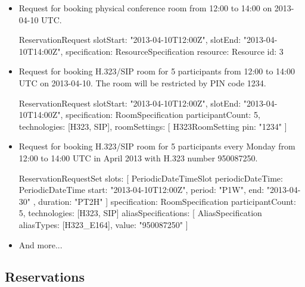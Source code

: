 \begin{itemize}

\item Request for booking physical conference room from 12:00 to 14:00 on 2013-04-10 UTC.
\begin{Entity}
ReservationRequest {
  slotStart: "2013-04-10T12:00Z",
  slotEnd:   "2013-04-10T14:00Z",
  specification: ResourceSpecification {
    resource: Resource { id: 3 }
  }
}
\end{Entity}

\item Request for booking H.323/SIP room for 5 participants from 12:00 to 14:00 UTC on 2013-04-10. The room will be restricted by PIN code 1234.
\begin{Entity}
ReservationRequest {
  slotStart: "2013-04-10T12:00Z",
  slotEnd:   "2013-04-10T14:00Z",
  specification: RoomSpecification {
    participantCount: 5,
    technologies: [H323, SIP],
    roomSettings: [
      H323RoomSetting { pin: "1234" }
    ]
  }
}
\end{Entity}

\newpage
\item Request for booking H.323/SIP room for 5 participants every Monday from 12:00 to 14:00 UTC in April 2013 with H.323 number 950087250.
\begin{Entity}
ReservationRequestSet {
  slots: [
    PeriodicDateTimeSlot {
      periodicDateTime: PeriodicDateTime {
        start:  "2013-04-10T12:00Z",
        period: "P1W",
        end:    "2013-04-30"
      },
      duration: "PT2H"
    }
  ]
  specification: RoomSpecification {
    participantCount: 5,
    technologies: [H323, SIP]
    aliasSpecifications: [
      AliasSpecification { aliasTypes: [H323_E164], value: "950087250" }
    ]
  }
}
\end{Entity}

\item And more...

\end{itemize}



\cleardoublepage
\subsection{Reservations}

